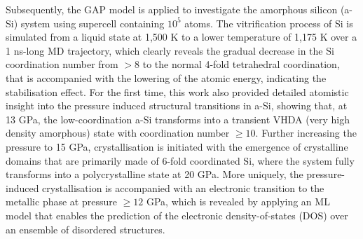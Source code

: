 Subsequently, the GAP model is  applied to investigate the amorphous silicon (a-Si) system using supercell containing $10^5$ atoms.\cite{deringer2021origins} The  vitrification process of Si is simulated from a liquid state at 1,500 K to a lower temperature of 1,175 K over a 1 ns-long MD trajectory, which clearly reveals the gradual decrease in the Si coordination number from $>8$ to the normal 4-fold tetrahedral coordination, that is accompanied with the lowering of the atomic energy, indicating the stabilisation effect. For the first time, this work also provided detailed atomistic insight into the pressure induced structural transitions in a-Si, showing that, at 13 GPa, the low-coordination a-Si transforms into a transient VHDA (very high density amorphous) state with coordination number $\geq 10$. Further increasing the pressure to 15 GPa, crystallisation is initiated with the emergence of crystalline domains that are primarily made of 6-fold coordinated Si, where the system fully transforms into a polycrystalline state at 20 GPa. More uniquely, the pressure-induced crystallisation is accompanied with an electronic  transition to the  metallic phase at pressure $\geq 12$ GPa, which is revealed by applying an ML model that enables the prediction of the electronic density-of-states (DOS) over an ensemble of disordered structures.\cite{mahmoud2020learning}

